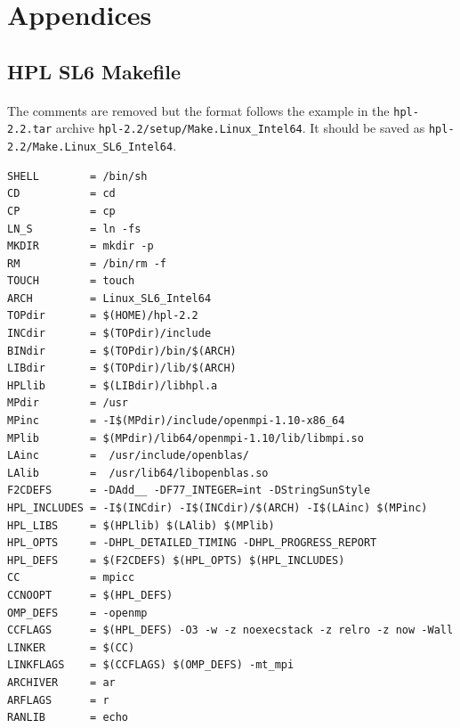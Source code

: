 \documentclass{article}
\newenvironment{code}{\captionsetup{type=listing}}{}
\begin{document}
\printbibliography[title={Sources}]



































\clearpage


\appendix
    \section*{Appendices}
    \renewcommand{\thesubsection}{\Alph{subsection}}

    \subsection{HPL SL6 Makefile}
    \label{appendix:makefile}

    \paragraph{}
    The comments are removed but the format follows the example in the \verb|hpl-2.2.tar| archive \verb|hpl-2.2/setup/Make.Linux_Intel64|. It should be saved as \verb|hpl-2.2/Make.Linux_SL6_Intel64|.
        \begin{code}
        \label{code:builds-cloud-make-linux_sl6_intel64}
        \begin{verbatim}
SHELL        = /bin/sh
CD           = cd
CP           = cp
LN_S         = ln -fs
MKDIR        = mkdir -p
RM           = /bin/rm -f
TOUCH        = touch
ARCH         = Linux_SL6_Intel64
TOPdir       = $(HOME)/hpl-2.2
INCdir       = $(TOPdir)/include
BINdir       = $(TOPdir)/bin/$(ARCH)
LIBdir       = $(TOPdir)/lib/$(ARCH)
HPLlib       = $(LIBdir)/libhpl.a
MPdir        = /usr
MPinc        = -I$(MPdir)/include/openmpi-1.10-x86_64
MPlib        = $(MPdir)/lib64/openmpi-1.10/lib/libmpi.so
LAinc        =  /usr/include/openblas/
LAlib        =  /usr/lib64/libopenblas.so
F2CDEFS      = -DAdd__ -DF77_INTEGER=int -DStringSunStyle
HPL_INCLUDES = -I$(INCdir) -I$(INCdir)/$(ARCH) -I$(LAinc) $(MPinc)
HPL_LIBS     = $(HPLlib) $(LAlib) $(MPlib)
HPL_OPTS     = -DHPL_DETAILED_TIMING -DHPL_PROGRESS_REPORT
HPL_DEFS     = $(F2CDEFS) $(HPL_OPTS) $(HPL_INCLUDES)
CC           = mpicc
CCNOOPT      = $(HPL_DEFS)
OMP_DEFS     = -openmp
CCFLAGS      = $(HPL_DEFS) -O3 -w -z noexecstack -z relro -z now -Wall
LINKER       = $(CC)
LINKFLAGS    = $(CCFLAGS) $(OMP_DEFS) -mt_mpi
ARCHIVER     = ar
ARFLAGS      = r
RANLIB       = echo

        \end{verbatim}
        \end{code}
\end{document}
